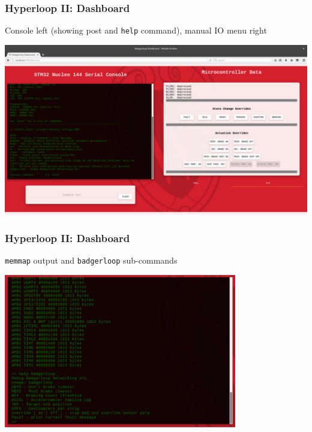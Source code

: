 \documentclass{beamer}
\begin{document}
\begin{frame}
\frametitle{Hyperloop II: Dashboard}
    Console left (showing post and \texttt{help} command), manual IO menu right
\begin{center}
    \includegraphics[width=\linewidth]{assets/badgerloop_2/Dashboard/dash_live2}
\end{center}
\end{frame}

\begin{frame}
\frametitle{Hyperloop II: Dashboard}
    \texttt{memmap} output and \texttt{badgerloop} sub-commands
\begin{center}
    \includegraphics[width=4in]{assets/badgerloop_2/Dashboard/dash_cli_example}
\end{center}
\end{frame}
\end{document}
